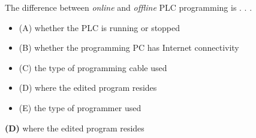 

The difference between {\it online} and {\it offline} PLC programming is . . .

\begin{itemize}
\item{(A)} whether the PLC is running or stopped
\vskip 5pt 
\item{(B)} whether the programming PC has Internet connectivity
\vskip 5pt 
\item{(C)} the type of programming cable used
\vskip 5pt 
\item{(D)} where the edited program resides
\vskip 5pt 
\item{(E)} the type of programmer used
\end{itemize}







{\bf (D)} where the edited program resides
 










